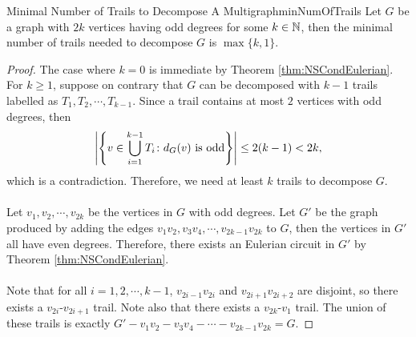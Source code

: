 \documentclass[math]{amznotes}
\theoremstyle{remark}
\newcommand{\0}{\mathbf{0}}
\newcommand{\1}{\mathbf{1}}
\begin{document}
\begin{probox}{Minimal Number of Trails to Decompose A Multigraph}{minNumOfTrails}
    Let $G$ be a graph with $2k$ vertices having odd degrees for some $k \in \mathbb{N}$, then the minimal number of trails needed to decompose $G$ is $\max\{k, 1\}$.
    \tcblower
    \begin{proof}
        The case where $k = 0$ is immediate by Theorem \ref{thm:NSCondEulerian}. For $k \geq 1$, suppose on contrary that $G$ can be decomposed with $k - 1$ trails labelled as $T_1, T_2, \cdots, T_{k - 1}$. Since a trail contains at most $2$ vertices with odd degrees, then
        \begin{equation*}
            {\left\lvert {\left\{v \in \bigcup_{i = 1}^{k - 1}T_i \colon d_G(v) \textrm{ is odd}\right\}} \right\rvert} \leq 2(k - 1) < 2k,
        \end{equation*}
        which is a contradiction. Therefore, we need at least $k$ trails to decompose $G$. 
        \\\\
        Let $v_1, v_2, \cdots, v_{2k}$ be the vertices in $G$ with odd degrees. Let $G'$ be the graph produced by adding the edges $v_1v_2, v_3v_4, \cdots, v_{2k - 1}v_{2k}$ to $G$, then the vertices in $G'$ all have even degrees. Therefore, there exists an Eulerian circuit in $G'$ by Theorem \ref{thm:NSCondEulerian}.
        \\\\
        Note that for all $i = 1, 2, \cdots, k - 1$, $v_{2i - 1}v_{2i}$ and $v_{2i + 1}v_{2i + 2}$ are disjoint, so there exists a $v_{2i}$-$v_{2i + 1}$ trail. Note also that there exists a $v_{2k}$-$v_1$ trail. The union of these trails is exactly $G' - v_1v_2 - v_3v_4 - \cdots - v_{2k - 1}v_{2k} = G$.
    \end{proof}
\end{probox}
\end{document}
